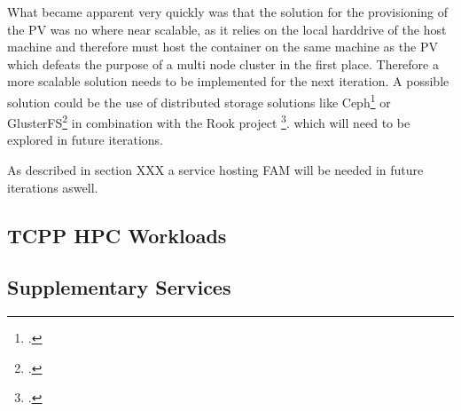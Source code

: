 What became apparent very quickly was that the solution for the provisioning of the \ac{PV} was no where near scalable,
as it relies on the local harddrive of the host machine and therefore must host the container on the same machine as the \ac{PV} which defeats the purpose of a multi node cluster in the first place.
Therefore a more scalable solution needs to be implemented for the next iteration.
A possible solution could be the use of distributed storage solutions like Ceph\footcite{CephIoHome} or GlusterFS\footcite{Gluster}  in combination with the Rook project \footcite{Rook}. 
which will need to be explored in future iterations.


As described in section XXX a service hosting \ac{FAM} will be needed in future iterations aswell.

\subsection{\ac{TCPP} HPC Workloads} 
\label{tcpp_hpc_workloads}

\subsection{Supplementary Services}



\newpage    
